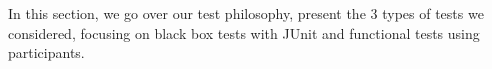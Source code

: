  
 In this section, we go over our test philosophy, present the 3 types of tests we considered, focusing on black box tests with JUnit and functional tests using participants.
